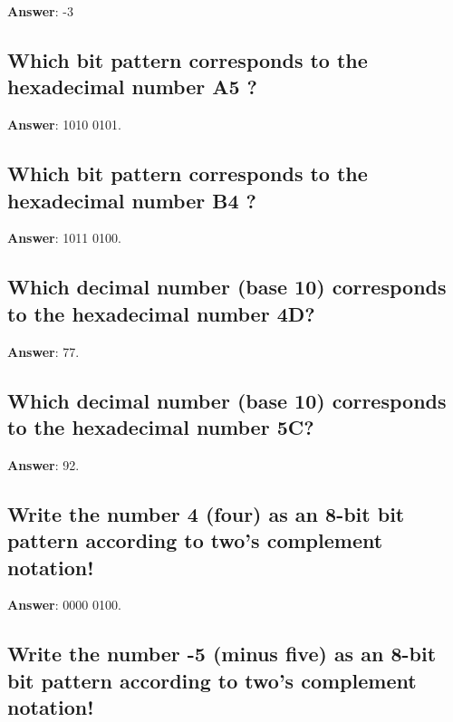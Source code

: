 \documentclass[a4paper,11pt,oneside]{article}
\begin{document}
\begin{sloppypar}
\label{q:381:sa:en:True}

\textbf{Answer}: -3



\subsection{Which bit pattern corresponds to the hexadecimal number A5 ?}

\label{q:382:sa:en:True}

\textbf{Answer}: 1010 0101.



\subsection{Which bit pattern corresponds to the hexadecimal number B4 ?}

\label{q:383:sa:en:True}

\textbf{Answer}: 1011 0100.



\subsection{Which decimal number (base 10) corresponds to the hexadecimal number 4D?}

\label{q:384:sa:en:True}

\textbf{Answer}: 77.



\subsection{Which decimal number (base 10) corresponds to the hexadecimal number 5C?}

\label{q:385:sa:en:True}

\textbf{Answer}: 92.



\subsection{Write the number 4 (four) as an 8-bit bit pattern according to two's complement notation!}

\label{q:386:sa:en:True}

\textbf{Answer}: 0000 0100.



\subsection{Write the number -5 (minus five) as an 8-bit bit pattern according to two's complement notation!}


\end{sloppypar}
\end{document}
